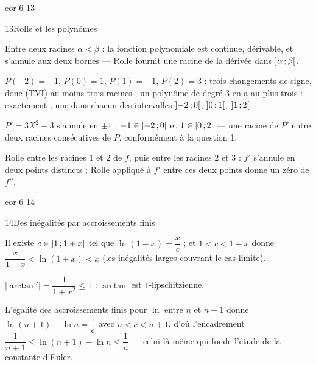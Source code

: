 \begin{blocLivre}{cor-6-13}
\begin{corrige}{13}{Rolle et les polynômes}
\begin{questions}
  \item Entre deux racines $\alpha<\beta$ : la fonction polynomiale est
    continue, dérivable, et s'annule aux deux bornes — Rolle fournit une
    racine de la dérivée dans $\mathopen{]}\alpha\,{;}\,\beta\mathclose{[}$.
  \item $P(-2)=-1$, $P(0)=1$, $P(1)=-1$, $P(2)=3$ : trois changements de
    signe, donc (TVI) au moins trois racines ; un polynôme de degré $3$ en
    a au plus trois : exactement , une
    dans chacun des intervalles $\mathopen{]}-2\,{;}\,0\mathclose{[}$, $\mathopen{]}0\,{;}\,1\mathclose{[}$,
    $\mathopen{]}1\,{;}\,2\mathclose{[}$.
  \item $P'=3X^{2}-3$ s'annule en $\pm1$ : $-1\in\mathopen{]}-2\,{;}\,0\mathclose{[}$ et
    $1\in\mathopen{]}0\,{;}\,2\mathclose{[}$ — une racine de $P'$ entre deux racines consécutives
    de $P$, conformément à la question 1.
  \item Rolle entre les racines $1$ et $2$ de $f$, puis entre les racines
    $2$ et $3$ : $f'$ s'annule en deux points distincts ; Rolle appliqué à
    $f'$ entre ces deux points donne un zéro de $f''$.
\end{questions}
\end{corrige}
\end{blocLivre}

\begin{blocLivre}{cor-6-14}
\begin{corrige}{14}{Des inégalités par accroissements finis}
\begin{questions}
  \item Il existe $c\in\mathopen{]}1\,{;}\,1+x\mathclose{[}$ tel que $\ln(1+x)=\dfrac{x}{c}$ ;
    et $1<c<1+x$ donne $\dfrac{x}{1+x}<\ln(1+x)<x$ (les inégalités larges
    couvrant le cas limite).
  \item $|\arctan'|=\dfrac{1}{1+x^{2}}\leq1$ : $\arctan$ est
    $1$-lipschitzienne.
  \item L'égalité des accroissements finis pour $\ln$ entre $n$ et $n+1$
    donne $\ln(n+1)-\ln n=\dfrac1c$ avec $n<c<n+1$, d'où l'encadrement
    $\dfrac{1}{n+1}\leq\ln(n+1)-\ln n\leq\dfrac1n$ — celui-là même qui
    fonde l'étude de la constante d'Euler.
\end{questions}
\end{corrige}
\end{blocLivre}

